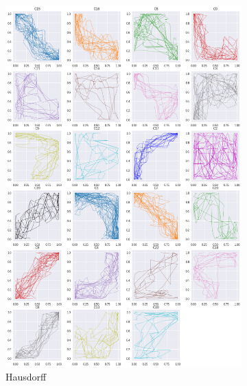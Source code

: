 \begin{figure}[h]
\begin{subfigure}[c]{0.3\linewidth}
     \includegraphics[width=\linewidth]{figs/clusters/CLU_H_ALL[Hd].png}
    \caption{Hausdorff}
  \end{subfigure}
  \hspace{.5em}
    \begin{subfigure}[c]{0.3\linewidth}

\end{subfigure}
\end{figure}
